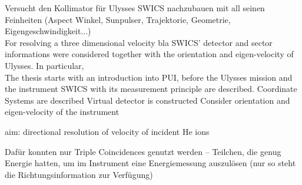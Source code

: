



Versucht den Kollimator für Ulysses SWICS nachzubauen mit all seinen Feinheiten (Aspect Winkel, Sunpulser, Trajektorie, Geometrie, Eigengeschwindigkeit...)
\\
For resolving a three dimensional velocity bla SWICS' detector and sector informations were considered together with the orientation and eigen-velocity of Ulysses. In particular, \\

The thesis starts with an introduction into PUI, before the Ulysses mission and the instrument SWICS with its measurement principle are described. 
Coordinate Systems are described
Virtual detector is constructed 
Consider orientation and eigen-velocity of the instrument


aim: directional resolution of velocity of incident He ions

Dafür konnten nur Triple Coincidences genutzt werden -- Teilchen, die genug Energie hatten, um im Instrument eine Energiemessung auszulösen (nur so steht die Richtungsinformation zur Verfügung)
